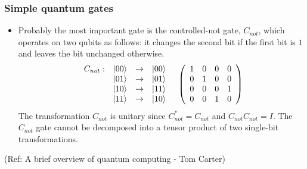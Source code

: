  \begin{frame}[fragile]\frametitle{Simple quantum gates}

\begin{itemize}

\item Probably the most important gate is the controlled-{\sc not} gate, $C_{not}$, which
operates on two qubits as follows: it changes the second 
bit if the first bit is $1$ and leaves the bit unchanged otherwise.
$$\begin{array}{ll}\begin{array}{lrcl}
C_{not}:& |{00}\rangle & \to & |{00}\rangle\\
        & |{01}\rangle & \to & |{01}\rangle\\
        & |{10}\rangle & \to & |{11}\rangle\\
        & |{11}\rangle & \to & |{10}\rangle\\
\end{array} & \left(\begin{array}{cccc}1 & 0 & 0 & 0\\ 0 & 1 & 0 & 0\\
				       0 & 0 & 0 & 1\\ 0 & 0 & 1 & 0\end{array}\right)\\
\end{array}$$
The transformation $C_{not}$ is unitary since $C_{not}^*=C_{not}$ and
$C_{not}C_{not}= I$. 
The $C_{not}$ gate cannot
be decomposed into a tensor product of two 
single-bit transformations.

\end{itemize}

\tiny{(Ref: A brief overview of quantum computing - Tom Carter)}

\end{frame}

